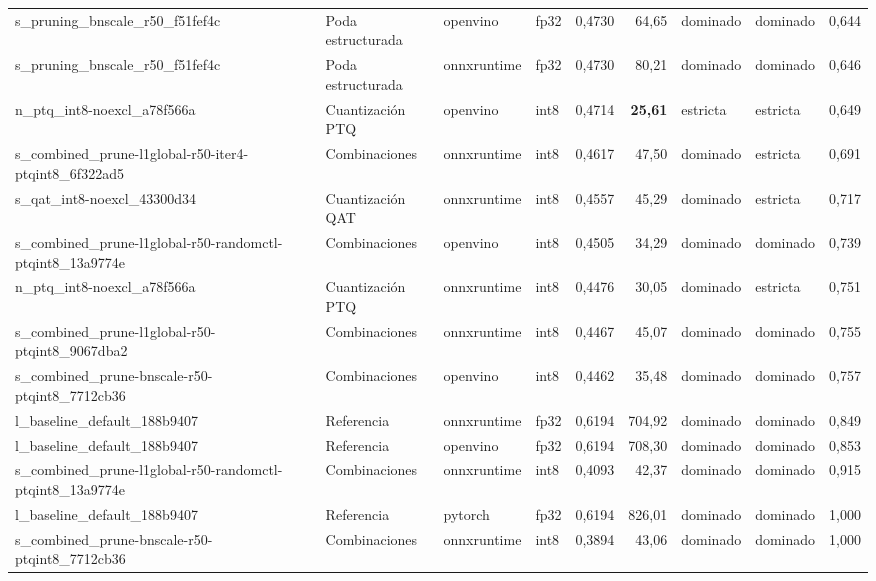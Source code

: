 \begin{landscape}
\begin{table}[htbp]
\begin{adjustbox}{max width=\linewidth, max totalheight=\dimexpr\textheight-\ht\tfmedgetitle-\dp\tfmedgetitle-\ht\tfmedgenotes-\dp\tfmedgenotes-6pt\relax}
\begin{tabular}{llllrrllr}
    s\_pruning\_bnscale\_r50\_f51fef4c & Poda estructurada & openvino & fp32 & 0,4730 & 64,65 & dominado & dominado & 0,644 \\
    s\_pruning\_bnscale\_r50\_f51fef4c & Poda estructurada & onnxruntime & fp32 & 0,4730 & 80,21 & dominado & dominado & 0,646 \\
    n\_ptq\_int8-noexcl\_a78f566a & Cuantización PTQ & openvino & int8 & 0,4714 & \textbf{25,61} & estricta & estricta & 0,649 \\
    s\_combined\_prune-l1global-r50-iter4-ptqint8\_6f322ad5 & Combinaciones & onnxruntime & int8 & 0,4617 & 47,50 & dominado & estricta & 0,691 \\
    s\_qat\_int8-noexcl\_43300d34 & Cuantización QAT & onnxruntime & int8 & 0,4557 & 45,29 & dominado & estricta & 0,717 \\
    s\_combined\_prune-l1global-r50-randomctl-ptqint8\_13a9774e & Combinaciones & openvino & int8 & 0,4505 & 34,29 & dominado & dominado & 0,739 \\
    n\_ptq\_int8-noexcl\_a78f566a & Cuantización PTQ & onnxruntime & int8 & 0,4476 & 30,05 & dominado & estricta & 0,751 \\
    s\_combined\_prune-l1global-r50-ptqint8\_9067dba2 & Combinaciones & onnxruntime & int8 & 0,4467 & 45,07 & dominado & dominado & 0,755 \\
    s\_combined\_prune-bnscale-r50-ptqint8\_7712cb36 & Combinaciones & openvino & int8 & 0,4462 & 35,48 & dominado & dominado & 0,757 \\
    l\_baseline\_default\_188b9407 & Referencia & onnxruntime & fp32 & 0,6194 & 704,92 & dominado & dominado & 0,849 \\
    l\_baseline\_default\_188b9407 & Referencia & openvino & fp32 & 0,6194 & 708,30 & dominado & dominado & 0,853 \\
    s\_combined\_prune-l1global-r50-randomctl-ptqint8\_13a9774e & Combinaciones & onnxruntime & int8 & 0,4093 & 42,37 & dominado & dominado & 0,915 \\
    l\_baseline\_default\_188b9407 & Referencia & pytorch & fp32 & 0,6194 & 826,01 & dominado & dominado & 1,000 \\
    s\_combined\_prune-bnscale-r50-ptqint8\_7712cb36 & Combinaciones & onnxruntime & int8 & 0,3894 & 43,06 & dominado & dominado & 1,000 \\
    \bottomrule
  \end{tabular}
  \end{adjustbox}
  \par\vspace{2pt}
  \usebox{\tfmedgenotes}
\end{table}
\end{landscape}
